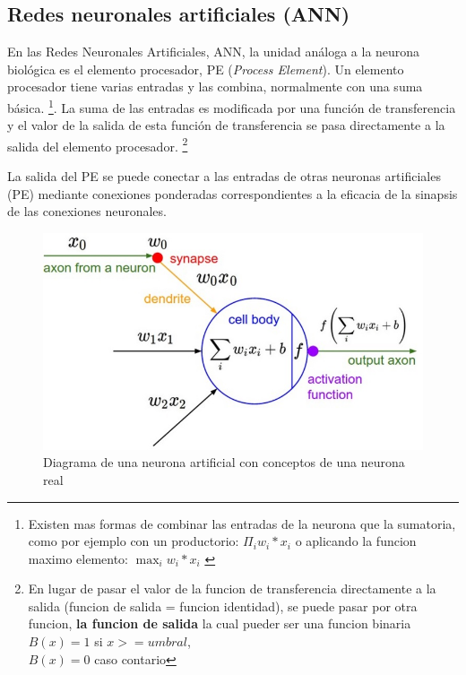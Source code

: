 \documentclass[runningheads]{llncs} %
\begin{document}
\subsection{Redes neuronales artificiales (ANN)}
En las Redes Neuronales Artificiales, ANN, la unidad análoga a la neurona biológica es
el elemento procesador, PE (\textit{Process Element}). Un elemento procesador tiene varias
entradas y las combina, normalmente con una suma básica. 
\footnote[1]{Existen mas formas de combinar las entradas de la neurona 
que la sumatoria, como por ejemplo con un productorio: \(\Pi_{i}{w_{i}*x_{i}}\)
o aplicando la funcion maximo elemento: \(\max_{i}{w_{i}*x_{i}}\) \cite{tesis-matich}}.
La suma de las entradas es
modificada por una función de transferencia y el valor de la salida de esta función de
transferencia se pasa directamente a la salida del elemento procesador.
\footnote[2]{En lugar de pasar el valor de la funcion de transferencia
directamente a la salida (funcion de salida = funcion identidad), 
se puede pasar por otra funcion, \textbf{la funcion de salida} 
la cual pueder ser una funcion binaria \cite{tesis-matich} \\
\(B(x)=1\) si \(x>=umbral\), \\
\(B(x)=0\) caso contario}

La salida del PE se puede conectar a las entradas de otras neuronas artificiales (PE)
mediante conexiones ponderadas correspondientes a la eficacia de la sinapsis de las
conexiones neuronales. \cite{libro-def}

\begin{figure}
    \centering
    \includegraphics[scale=0.6]{neurona_artificial2.png}
    \caption{Diagrama de una neurona artificial con conceptos de una neurona real \cite{img-neurona_artificial2}}
    \label{fig:neurona_artificial}
\end{figure}
\end{document}

